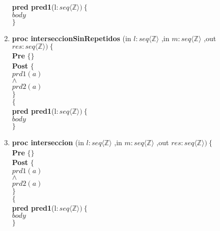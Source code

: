 \documentclass[a4paper]{article}
\begin{document}
\begin{enumerate}[label=\alph*)]
			\textbf{pred pred1}(l$: seq\langle \mathbb{Z}\rangle)\ \{$\smallskip \\
			\hspace*{6mm}$body$\\
			$\}$	
			
		\item
			
			\textbf{proc interseccionSinRepetidos }(in $l:seq\langle \mathbb{Z}\rangle$
				,in $m:seq\langle \mathbb{Z}\rangle$
				,out $res:seq\langle \mathbb{Z}\rangle )\ \{$\smallskip \\
			\hspace*{6mm} \textbf{Pre }$\{ \}$\smallskip \\
			\hspace*{6mm} \textbf{Post }$\{$\\
			\hspace*{6mm} $prd1(a)$\\
			\hspace*{6mm} $\wedge$\\
			\hspace*{6mm} $prd2(a)$\\
			\hspace*{6mm} $\}$\\
			$\{$\smallskip \\
			
			\textbf{pred pred1}(l$: seq\langle \mathbb{Z}\rangle)\ \{$\smallskip \\
			\hspace*{6mm}$body$\\
			$\}$	
			
		\item
			
			\textbf{proc interseccion }(in $l:seq\langle \mathbb{Z}\rangle$
				,in $m:seq\langle \mathbb{Z}\rangle$
				,out $res:seq\langle \mathbb{Z}\rangle )\ \{$\smallskip \\
			\hspace*{6mm} \textbf{Pre }$\{ \}$\smallskip \\
			\hspace*{6mm} \textbf{Post }$\{$\\
			\hspace*{6mm} $prd1(a)$\\
			\hspace*{6mm} $\wedge$\\
			\hspace*{6mm} $prd2(a)$\\
			\hspace*{6mm} $\}$\\
			$\{$\smallskip \\
			
			\textbf{pred pred1}(l$: seq\langle \mathbb{Z}\rangle)\ \{$\smallskip \\
			\hspace*{6mm}$body$\\
			$\}$	
	\end{enumerate}
	
\end{document}
